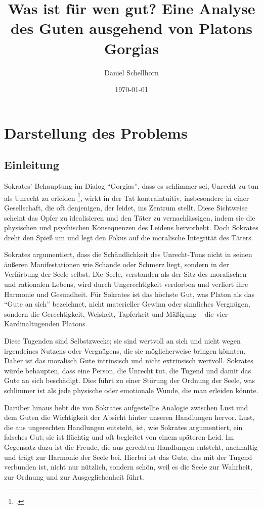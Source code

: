 \documentclass[12pt,a4paper]{article}
\title{Was ist für wen gut? Eine Analyse des Guten ausgehend von Platons Gorgias}
\author{Daniel Schellhorn}
\date{\today}
\begin{document}
 

\maketitle

\section{Darstellung des Problems}
\subsection[short]{Einleitung}
Sokrates' Behauptung im Dialog \enquote{Gorgias}, dass es schlimmer sei, Unrecht zu tun als Unrecht zu erleiden \footcite[475e]{gorgias}, wirkt in der Tat kontraintuitiv, insbesondere in einer Gesellschaft, die oft denjenigen, der leidet, ins Zentrum stellt. Diese Sichtweise scheint das Opfer zu idealisieren und den Täter zu vernachlässigen, indem sie die physischen und psychischen Konsequenzen des Leidens hervorhebt. Doch Sokrates dreht den Spieß um und legt den Fokus auf die moralische Integrität des Täters.

Sokrates argumentiert, dass die Schändlichkeit des Unrecht-Tuns nicht in seinen äußeren Manifestationen wie Schande oder Schmerz liegt, sondern in der Verfärbung der Seele selbst. Die Seele, verstanden als der Sitz des moralischen und rationalen Lebens, wird durch Ungerechtigkeit verdorben und verliert ihre Harmonie und Gesundheit.  Für Sokrates ist das höchste Gut, was Platon als das \enquote{Gute an sich} bezeichnet, nicht materieller Gewinn oder sinnliches Vergnügen, sondern die Gerechtigkeit, Weisheit, Tapferkeit und Mäßigung – die vier Kardinaltugenden Platons.

Diese Tugenden sind Selbstzwecke; sie sind wertvoll an sich und nicht wegen irgendeines Nutzens oder Vergnügens, die sie möglicherweise bringen könnten. Daher ist das moralisch Gute intrinsisch und nicht extrinsisch wertvoll. Sokrates würde behaupten, dass eine Person, die Unrecht tut, die Tugend und damit das Gute an sich beschädigt. Dies führt zu einer Störung der Ordnung der Seele, was schlimmer ist als jede physische oder emotionale Wunde, die man erleiden könnte.

Darüber hinaus hebt die von Sokrates aufgestellte Analogie zwischen Lust und dem Guten die Wichtigkeit der Absicht hinter unseren Handlungen hervor. Lust, die aus ungerechten Handlungen entsteht, ist, wie Sokrates argumentiert, ein falsches Gut; sie ist flüchtig und oft begleitet von einem späteren Leid. Im Gegensatz dazu ist die Freude, die aus gerechten Handlungen entsteht, nachhaltig und trägt zur Harmonie der Seele bei. Hierbei ist das Gute, das mit der Tugend verbunden ist, nicht nur nützlich, sondern schön, weil es die Seele zur Wahrheit, zur Ordnung und zur Ausgeglichenheit führt.
\end{document}
